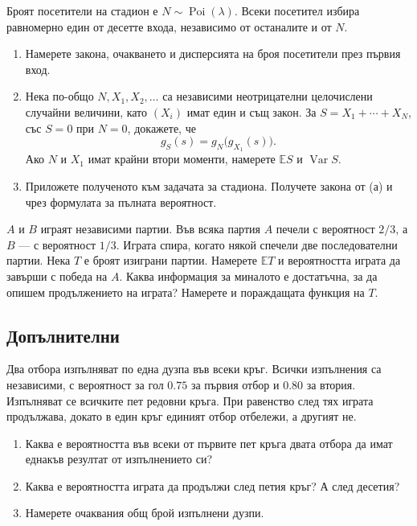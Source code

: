 \documentclass[11pt,a4paper]{article}
\newenvironment{enumeratea}{\begin{enumerate}[label=(\alph*),itemsep=0.28em,topsep=0.25em]}{\end{enumerate}}
\newcommand{\Ebb}{\mathbb E}
\newcommand{\Var}{\operatorname{Var}}
\newcommand{\Poi}{\operatorname{Poi}}
\newcounter{problem}[section]
\begin{document}
\begin{problempencil}
Броят посетители на стадион е $N\sim\Poi(\lambda)$. Всеки посетител избира
равномерно един от десетте входа, независимо от останалите и от $N$.
\begin{enumeratea}
  \item Намерете закона, очакването и дисперсията на броя посетители през
  първия вход.
  \item Нека по-общо $N,X_1,X_2,\ldots$ са независими неотрицателни
  целочислени случайни величини, като $(X_i)$ имат един и същ закон.
  За $S=X_1+\cdots+X_N$, със $S=0$ при $N=0$, докажете, че
  \[
  g_S(s)=g_N\bigl(g_{X_1}(s)\bigr).
  \]
  Ако $N$ и $X_1$ имат крайни втори моменти, намерете $\Ebb S$ и $\Var S$.
  \item Приложете полученото към задачата за стадиона.
  Получете закона от (а) и чрез формулата за пълната вероятност.
\end{enumeratea}
\end{problempencil}

\begin{problembook}
$A$ и $B$ играят независими партии. Във всяка партия $A$ печели с вероятност
$2/3$, а $B$ --- с вероятност $1/3$. Играта спира, когато някой спечели две
последователни партии. Нека $T$ е броят изиграни партии.
Намерете $\Ebb T$ и вероятността играта да завърши с победа на $A$.
Каква информация за миналото е достатъчна, за да опишем продължението на играта?
Намерете и пораждащата функция на $T$.
\end{problembook}

\subsection*{Допълнителни}

\begin{problempencil}
Два отбора изпълняват по една дузпа във всеки кръг. Всички изпълнения са
независими, с вероятност за гол $0.75$ за първия отбор и $0.80$ за втория.
Изпълняват се всичките пет редовни кръга. При равенство след тях играта
продължава, докато в един кръг единият отбор отбележи, а другият не.
\begin{enumeratea}
  \item Каква е вероятността във всеки от първите пет кръга двата отбора
  да имат еднакъв резултат от изпълнението си?
  \item Каква е вероятността играта да продължи след петия кръг?
  А след десетия?
  \item Намерете очаквания общ брой изпълнени дузпи.
\end{enumeratea}
\end{problempencil}
\end{document}
